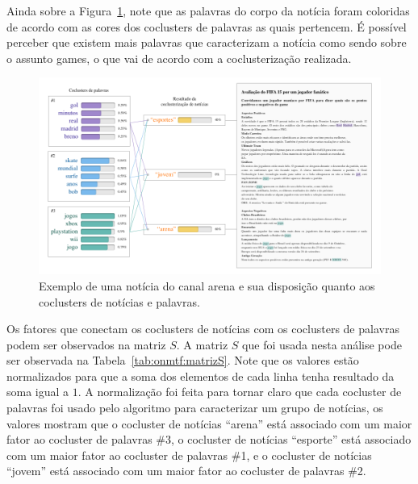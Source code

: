 \documentclass[
    12pt,                %
    oneside,            %
    a4paper,            %
    english,            %
    brazil                %
    ]{abntex2ppgsi}
\begin{document}
Ainda sobre a Figura~\ref{fig:analysis-onmtf}, note que as palavras do corpo da notícia foram coloridas de acordo com as cores dos coclusters de palavras as quais pertencem.
É possível perceber que existem mais palavras que caracterizam a notícia como sendo sobre o assunto games, o que vai de acordo com a coclusterização realizada.

\begin{figure}[H]
    \centering
    \includegraphics[width=1\textwidth]{img/analysis-onmtf.png}
    \caption{Exemplo de uma notícia do canal arena e sua disposição quanto aos coclusters de notícias e palavras.}
    \label{fig:analysis-onmtf}
\end{figure}

Os fatores que conectam os coclusters de notícias com os coclusters de palavras podem ser observados na matriz $S$.
A matriz $S$ que foi usada nesta análise pode ser observada na Tabela~\ref{tab:onmtf:matrizS}.
Note que os valores estão normalizados para que a soma dos elementos de cada linha tenha resultado da soma igual a $1$.
A normalização foi feita para tornar claro que cada cocluster de palavras foi usado pelo algoritmo para caracterizar um grupo de notícias, os valores mostram que o cocluster de notícias ``arena'' está associado com um maior fator ao cocluster de palavras \#3, o cocluster de notícias ``esporte'' está associado com um maior fator ao cocluster de palavras \#1, e o cocluster de notícias ``jovem'' está associado com um maior fator ao cocluster de palavras \#2.
\end{document}
